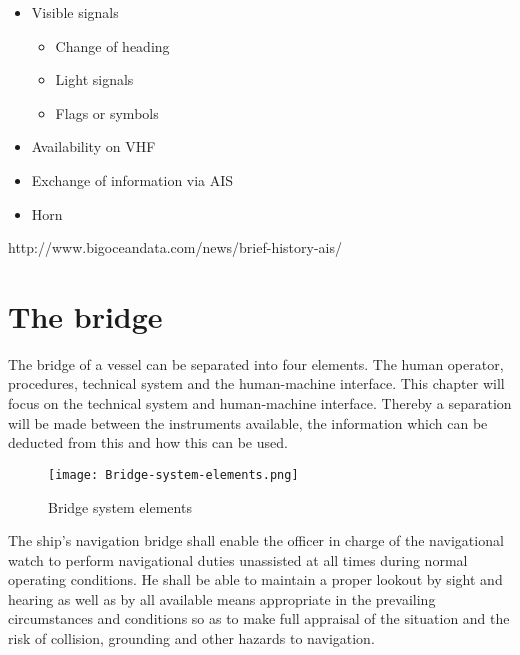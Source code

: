 \begin{itemize}
	\item Visible signals
	\begin{itemize}
		\item Change of heading
		\item Light signals
		\item Flags or symbols
	\end{itemize}
	\item Availability on \ac{VHF}
	\item Exchange of information via \ac{AIS}
	\item Horn
\end{itemize}

http://www.bigoceandata.com/news/brief-history-ais/

\section{The bridge}
The bridge of a vessel can be separated into four elements. The human operator, procedures,
technical system and the human-machine interface. This chapter will focus on the technical system and human-machine interface. Thereby a separation will be made between the instruments available, the information which can be deducted from this and how this can be used. 

\begin{figure}[H]
	\centering
	\texttt{[image: Bridge-system-elements.png]}
	\caption{Bridge system elements}
	\label{fig:Bridge-system-elements}
\end{figure}

The ship’s navigation bridge shall enable the officer in charge of the navigational watch to perform navigational duties unassisted at all times during normal operating conditions. He shall be able to maintain a proper lookout by sight and hearing as well as by all available means appropriate in the prevailing circumstances and conditions so as to make full appraisal of the situation and the risk of collision, grounding and other hazards to navigation.

